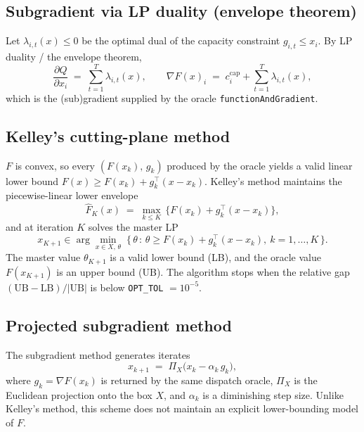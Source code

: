 \documentclass[11pt]{article}
\begin{document}
\subsection{Subgradient via LP duality (envelope theorem)}
Let $\lambda_{i,t}(x) \le 0$ be the optimal dual of the capacity
constraint $g_{i,t} \le x_i$. By LP duality / the envelope theorem,
\begin{equation}
    \frac{\partial Q}{\partial x_i}
    \;=\; \sum_{t=1}^{T} \lambda_{i,t}(x),
    \qquad
    \nabla F(x)_i
    \;=\; c^{\text{cap}}_i + \sum_{t=1}^{T} \lambda_{i,t}(x),
\end{equation}
which is the (sub)gradient supplied by the oracle \texttt{functionAndGradient}.

\subsection{Kelley's cutting-plane method}
$F$ is convex, so every $(F(x_k),\, g_k)$ produced by the oracle
yields a valid linear lower bound
$F(x) \ge F(x_k) + g_k^\top (x - x_k)$. Kelley's method maintains the
piecewise-linear lower envelope
\begin{equation}
    \hat F_K(x) \;=\; \max_{k \le K}\, \bigl\{ F(x_k) + g_k^\top (x - x_k) \bigr\},
\end{equation}
and at iteration $K$ solves the master LP
\begin{equation}
    x_{K+1} \in \arg\min_{x \in X,\, \theta} \;
        \{\, \theta \,:\, \theta \ge F(x_k) + g_k^\top (x - x_k),\ k = 1,\dots,K \,\}.
\end{equation}
The master value $\theta_{K+1}$ is a valid lower bound (LB), and the
oracle value $F(x_{K+1})$ is an upper bound (UB). The algorithm stops
when the relative gap $(\text{UB} - \text{LB}) / |\text{UB}|$ is below
\texttt{OPT\_TOL} $= 10^{-5}$.

\subsection{Projected subgradient method}
The subgradient method generates iterates
\begin{equation}
    x_{k+1} \;=\; \Pi_X\bigl( x_k - \alpha_k\, g_k \bigr),
\end{equation}
where $g_k = \nabla F(x_k)$ is returned by the same dispatch oracle,
$\Pi_X$ is the Euclidean projection onto the box $X$, and $\alpha_k$
is a diminishing step size. Unlike Kelley's method, this scheme does
not maintain an explicit lower-bounding model of $F$.
\end{document}
